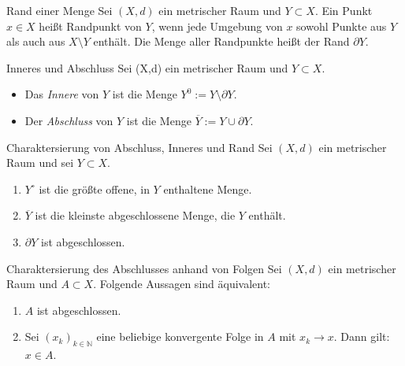 
\begin{definition}{Rand einer Menge}
    Sei $(X,d)$ ein metrischer Raum und $Y\subset X$. Ein Punkt $x\in X$ heißt Randpunkt von $Y$, wenn jede Umgebung von $x$ sowohl Punkte aus $Y$ als auch aus $X\setminus Y$ enthält. Die Menge aller Randpunkte heißt der Rand $\partial Y$.
\end{definition}

\begin{definition}{Inneres und Abschluss}
    Sei (X,d) ein metrischer Raum und $Y\subset X$.
    \begin{itemize}
        \item[(i)] Das \emph{Innere} von $Y$ ist die Menge $Y^0 := Y \setminus \partial Y$.
        \item[(ii)] Der \emph{Abschluss} von $Y$ ist die Menge $\overline{Y}:= Y \cup \partial Y$.
    \end{itemize}
\end{definition}

\begin{satz}{Charaktersierung von Abschluss, Inneres und Rand}
    Sei $(X,d)$ ein metrischer Raum und sei $Y\subset X$.

    \begin{enumerate}%
        \item $Y^{\circ}$ ist die größte offene, in $Y$ enthaltene Menge.
        \item $\overline{Y}$ ist die kleinste abgeschlossene Menge, die $Y$ enthält.
        \item $\partial Y$ ist abgeschlossen.
    \end{enumerate}  
\end{satz}

\begin{satz}{Charaktersierung des Abschlusses anhand von Folgen}
    Sei $ (X,d) $ ein metrischer Raum und $A \subset X$. Folgende Aussagen sind äquivalent:

    \begin{enumerate}
        \item[(i)] $A$ ist abgeschlossen.
        \item[(ii)] Sei $(x_k)_{k\in\mathbb{N}}$ eine beliebige konvergente Folge in $A$ mit $x_k \to x$. Dann gilt: $x \in A$.
    \end{enumerate}   
\end{satz}

